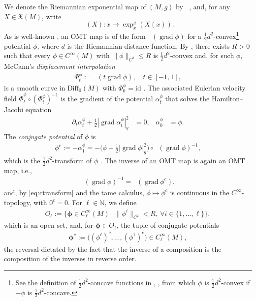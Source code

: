 \documentclass{article}
\theoremstyle{remark}
\newcommand{\M}{M}
\newcommand{\Cinf}{C^{\infty}(\M)}
\newcommand{\CinfV}[1]{C_{#1}^{\infty}(\M)}
\newcommand{\cconv}{$\tfrac{1}{2}d^2$-convex}
\newcommand{\X}{\mathfrak{X}(\M)}
\newcommand{\Diff}{\mathrm{Diff}_0(\M)}
\DeclareMathOperator{\grad}{\mathrm{grad}}
\DeclareMathOperator{\expg}{\mathrm{exp}^{\text{$g$}}}
\begin{document}
%
We denote the Riemannian exponential map of $(\M,g)$ by $\expg$, and, for any $X\in\X$, write
%
$$
\expg(X):x\mapsto\exp_x^g(X(x)).
$$
%
As is well-known \cite{McCann2001}, an OMT map is of the form $\expg(\grad\phi)$ for a $\tfrac{1}{2}d^2$-convex\footnote{See the definition of $\tfrac{1}{2}d^{2}$-concave functions in \cite[Section 3.3]{rachev1998mass}, \cite{McCann2001}, from which $\phi$ is \cconv{} if $-\phi$ is $\tfrac{1}{2}d^{2}$-concave.} potential $\phi$, where $d$ is the Riemannian distance function. By \cite[Theorem 13.5]{Villani2009}, there exists $R>0$ such that every $\phi\in\Cinf$ with $\|\phi\|_{C^2}\leq R$ is \cconv{} and, for such $\phi$, McCann's \emph{displacement interpolation} \cite{McCann1997}
%
\begin{align*}
    \Phi^\phi_t:=\expg(t\grad\phi), \quad t\in[-1,1],
\end{align*}
%
is a smooth curve in $\Diff$ with $\Phi^\phi_0=\mathrm{id}$ \cite{McCann2001}. The associated Eulerian velocity field $\dot{\Phi}^\phi_t\circ(\Phi^\phi_t)^{-1}$ is the gradient of the potential $\alpha^\phi_t$ that solves the Hamilton--Jacobi equation
%
\begin{align}\label{eq:HJ}
    \partial_t\alpha^\phi_t+\tfrac{1}{2}|\grad\alpha^\phi_t|_g^2&=0, & \alpha^\phi_0&=\phi.
\end{align}
%
The \emph{conjugate potential} of $\phi$ is
%
\begin{align}\label{eq:ctransform}
    \phi^c:=-\alpha^\phi_1=-\bigl(\phi+\tfrac{1}{2}|\grad\phi|_g^2\bigr)\circ\expg(\grad\phi)^{-1},
\end{align}
%
which is the $\tfrac{1}{2}d^2$-transform of $\phi$ \cite[Chapter 5]{Villani2009}. The inverse of an OMT map is again an OMT map, i.e.,
%
\begin{align}\label{eq:inverse_OMT}
    \expg(\grad\phi)^{-1}=\expg(\grad\phi^c),
\end{align}
%
and, by \eqref{eq:ctransform} and the tame calculus, $\phi\mapsto\phi^c$ is continuous in the $C^\infty$-topology, with $0^c=0$.
%
For $\ell\in\mathbb{N}$, we define
%
\begin{align}\label{eq:Oell}
    O_\ell:=\{\bm{\phi}\in\CinfV{\ell}~|~\|\phi^i\|_{C^2}<R,\ \forall i\in\{1,\dots,\ell\}\},
\end{align}
%
which is an open set, and, for $\bm{\phi}\in O_\ell$, the tuple of conjugate potentials
%
\begin{align*}
    \bm{\phi}^c:=\bigl((\phi^\ell)^c,\dots,(\phi^1)^c\bigr)\in\CinfV{\ell},
\end{align*}
%
the reversal dictated by the fact that the inverse of a composition is the composition of the inverses in reverse order.
%
\end{document}
